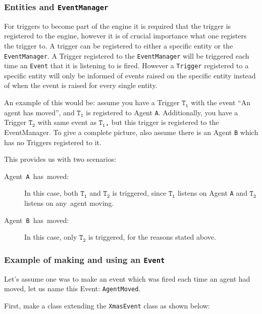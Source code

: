 \subsubsection{Entities and \texttt{EventManager}}

For triggers to become part of the engine it is required that the
trigger is registered to the engine, however it is of crucial importance
what one registers the trigger to. A trigger can be registered to
either a specific entity or the \texttt{EventManager}. A Trigger registered
to the \texttt{EventManager} will be triggered each time an \texttt{Event}
that it is listening to is fired. However a \texttt{Trigger} registered
to a specific entity will only be informed of events raised on the
specific entity instead of when the event is raised for every single
entity. 

An example of this would be: assume you have a Trigger \texttt{$\mathtt{T_{1}}$}
with the event \textquotedblleft{}An agent has moved\textquotedblright{},
and \texttt{$\mathtt{T_{1}}$} is registered to Agent \texttt{A}.
Additionally, you have a Trigger \texttt{$\mathtt{T_{2}}$} with same
event as \texttt{$\mathtt{T_{1}}$,} but this trigger is registered
to the EventManager. To give a complete picture, also assume there
is an Agent \texttt{B} which has no Triggers registered to it.

This provides us with two scenarios:
\begin{description}
\item [{Agent~\texttt{A}~has~moved:}] In this case, both \texttt{$\mathtt{T_{1}}$}
and \texttt{$\mathtt{T_{2}}$} is triggered, since \texttt{$\mathtt{T_{1}}$}
listens on Agent \texttt{A} and \texttt{$\mathtt{T_{2}}$} listens
on any\texttt{ }agent moving.
\item [{Agent~\texttt{B}~has~moved:}] In this case, only $\mathtt{T_{2}}$
is triggered, for the reasons stated above.
\end{description}

\subsubsection{Example of making and using an \texttt{Event}}

Let\textquoteright{}s assume one was to make an event which was fired
each time an agent had moved, let us name this Event: \texttt{AgentMoved}.

First, make a class extending the \texttt{XmasEvent} class as shown
below:

